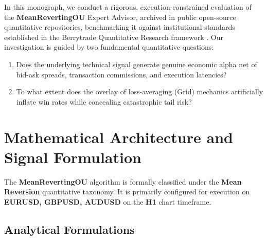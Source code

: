 \documentclass[11pt,a4paper]{article}
\begin{document}
In this monograph, we conduct a rigorous, execution-constrained evaluation of the \textbf{MeanRevertingOU} Expert Advisor, archived in public open-source quantitative repositories, benchmarking it against institutional standards established in the Berrytrade Quantitative Research framework \cite{artsu2026illusion}. Our investigation is guided by two fundamental quantitative questions:
\begin{enumerate}
    \item Does the underlying technical signal generate genuine economic alpha net of bid-ask spreads, transaction commissions, and execution latencies?
    \item To what extent does the overlay of loss-averaging (Grid) mechanics artificially inflate win rates while concealing catastrophic tail risk?
\end{enumerate}

\section{Mathematical Architecture and Signal Formulation}
The \textbf{MeanRevertingOU} algorithm is formally classified under the \textbf{Mean Reversion} quantitative taxonomy. It is primarily configured for execution on \textbf{EURUSD, GBPUSD, AUDUSD} on the \textbf{H1} chart timeframe.

\subsection{Analytical Formulations}
\end{document}
